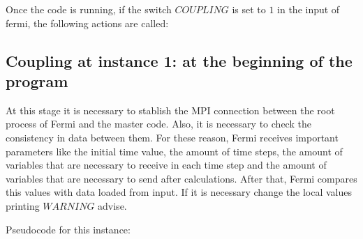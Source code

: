 Once the code is running, if the switch $COUPLING$ is set to $1$ in the input of fermi, the following actions are called:

\subsection*{Coupling at instance 1: at the beginning of the program}
At this stage it is necessary to stablish the MPI connection between the root process of Fermi and the master code.
Also, it is necessary to check the consistency in data between them.
For these reason, Fermi receives important parameters like the initial time value,
the amount of time steps, the amount of variables that are necessary to receive in each time step and the amount of variables that are necessary to send after calculations.
After that, Fermi compares this values with data loaded from input.
If it is necessary change the local values printing $WARNING$ advise.

Pseudocode for this instance:

